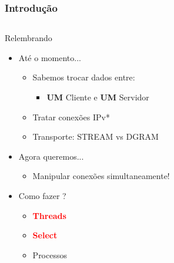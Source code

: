 \documentclass[10pt, xcolor=x11names]{beamer}
\begin{document}
\begin{frame} \frametitle{Introdução}
	
	\begin{columns}
			\begin{block}{Relembrando}	
				\begin{itemize}
					\item<1-> Até o momento...
					\begin{itemize}
						\item Sabemos trocar dados entre:
							\begin{itemize}
							 	\item \textbf{UM} Cliente e \textbf{UM} Servidor
							\end{itemize} 
						\item Tratar conexões IPv*
						\item Transporte: STREAM vs DGRAM
					\end{itemize}
					\item<2->  Agora queremos...
					\begin{itemize}
						\item Manipular conexões simultaneamente!
					\end{itemize}
					\item<3->  Como fazer ?
					\begin{itemize}
						\item \textcolor{red}{\textbf{Threads}}
						\item \textcolor{red}{\textbf{Select}}
						\item Processos
					\end{itemize}
				\end{itemize}
			\end{block}
			\begin{figure}
			\centering

\end{figure}
\end{columns}
\end{frame}
\end{document}
